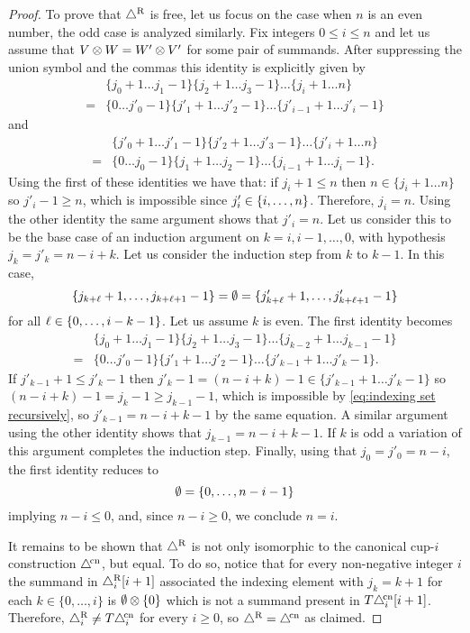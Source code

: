 \begin{proof}
	To prove that $\triangle^{\mathrm{R}}$ is free, let us focus on the case when $n$ is an even number, the odd case is analyzed similarly.
	Fix integers $0 \leq i \leq n$ and let us assume that $V \otimes W = W' \otimes V'$ for some pair of summands.
	After suppressing the union symbol and the commas this identity is explicitly given by
	\begin{align*}
		&\{j_0+1 \dots j_1-1\} \{j_2+1 \dots j_3-1\} \dots \{j_i+1 \dots n\} \\=
		&\{0 \dots j'_0-1\} \{j'_1+1 \dots j'_2-1\} \dots \{j'_{i-1}+1 \dots j'_i-1\}
	\end{align*}
	and
	\begin{align*}
		&\{j'_0+1 \dots j'_1-1\} \{j'_2+1 \dots j'_3-1\} \dots \{j'_i+1 \dots n\} \\=
		&\{0 \dots j_0-1\} \{j_1+1 \dots j_2-1\} \dots \{j_{i-1}+1 \dots j_i-1\}.
	\end{align*}
	Using the first of these identities we have that: if $j_i+1 \leq n$ then $n \in \{j_i+1 \dots n\}$ so $j'_i-1 \geq n$, which is impossible since $j'_i \in \{i,\dots,n\}$.
	Therefore, $j_i = n$.
	Using the other identity the same argument shows that $j'_i = n$.
	Let us consider this to be the base case of an induction argument on $k = i,i-1,\dots,0$, with hypothesis $j_k = j'_k = n-i+k$.
	Let us consider the induction step from $k$ to $k-1$.
	In this case,
	\[
	\{j_{k+\ell}+1,\dots,j_{k+\ell+1}-1\} = \emptyset = \{j'_{k+\ell}+1,\dots,j'_{k+\ell+1}-1\}
	\]
	for all $\ell \in \{0,\dots,i-k-1\}$.
	Let us assume $k$ is even.
	The first identity becomes
	\begin{align*}
		&\{j_0+1 \dots j_1-1\} \{j_2+1 \dots j_3-1\} \dots \{j_{k-2}+1 \dots j_{k-1}-1\} \\=
		&\{0 \dots j'_0-1\} \{j'_1+1 \dots j'_2-1\} \dots \{j'_{k-1}+1 \dots j'_k-1\}.
	\end{align*}
	If $j'_{k-1}+1 \leq j'_k-1$ then $j'_k - 1 = (n-i+k) - 1 \in \{j'_{k-1}+1 \dots j'_k-1\}$ so $(n-i+k)-1 = j_k - 1 \geq j_{k-1}-1$, which is impossible by \cref{eq:indexing set recursively}, so $j'_{k-1} = n-i+k-1$ by the same equation.
	A similar argument using the other identity shows that $j_{k-1} = n-i+k-1$.
	If $k$ is odd a variation of this argument completes the induction step.
	Finally, using that $j_0 = j'_0 = n-i$, the first identity reduces to
	\[
	\emptyset = \{0,\dots, n-i-1\}
	\]
	implying $n-i \leq 0$, and, since $n-i \geq 0$, we conclude $n=i$.

	It remains to be shown that $\triangle^{\mathrm{R}}$ is not only isomorphic to the canonical \mbox{cup-$i$} construction $\triangle^{\!\mathrm{cn}}$, but equal.
	To do so, notice that for every non-negative integer $i$ the summand in $\triangle_i^{\mathrm{R}}[i+1]$ associated the indexing element with $j_k = k+1$ for each $k \in \{0,\dots,i\}$ is $\emptyset \otimes \{0\}$ which is not a summand present in $T \triangle^{\!\mathrm{cn}}_i[i+1]$.
	Therefore, $\triangle_i^{\mathrm{R}} \neq T \triangle^{\!\mathrm{cn}}_i$ for every $i \geq 0$, so $\triangle^{\mathrm{R}} = \triangle^{\!\mathrm{cn}}$ as claimed.
\end{proof}